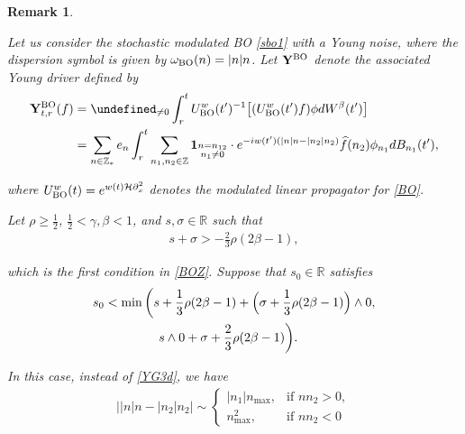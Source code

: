 \documentclass[letterpaper, 11pt,  reqno]{amsart}
\newtheorem{remark}[theorem]{Remark}
\newcommand{\1}{\hspace{0.5mm}\textup{I}\hspace{0.5mm}}
\newcommand{\noi}{\noindent}
\newcommand{\Z}{\mathbb{Z}}
\newcommand{\R}{\mathbb{R}}
\let\P= \undefined
\newcommand{\P}{\mathbf{P}}
\renewcommand{\H}{\mathcal{H}}
\newcommand{\be}{\beta}
\newcommand{\g}{\gamma}
\newcommand{\s}{\sigma}
\newcommand{\ft}{\widehat}
\newcommand{\dx}{\partial_x}
\renewcommand{\o}{\omega}
\newcommand{\ind}{\mathbf 1}
\newcommand{\uw}{U^w}
\newcommand{\BO}{\text{\rm BO} }
\newcommand{\YY}{\mathbf{Y}}
\numberwithin{equation}{section}
\numberwithin{theorem}{section}
\begin{document}
\begin{remark}\label{REM:BO}
\rm


Let us consider the stochastic modulated BO \eqref{sbo1} with a Young noise, 
where the dispersion symbol is given by $\o_\BO(n) = |n|n$.
Let $\YY^\BO$ denote 
the associated Young driver
defined by
\begin{align*}
\YY^\BO_{t, r}(f)
&  = \P_{\ne 0} \int_r^t
\uw_\BO(t')^{-1} \big[ (\uw_\BO(t') f)
\phi dW^\be (t') \big]\\
&
 = \sum_{n\in \Z_*} e_n 
 \int_r^t \sum_{n_1, n_2  \in \Z} \ind_{\substack{n = n_{12}\\n_1 \ne 0}}
\cdot  e^{- i w(t') (|n|n - |n_2|n_2)}\ft f(n_2) \phi_{n_1}    dB_{n_1}(t'), 
\end{align*}

\noi
where 
$\uw_\BO (t)=e^{   w(t)\H\dx^2}  $
denotes the modulated linear propagator for \eqref{BO}.










Let 
$\rho \ge\frac 12$,
$\frac 12 < \g, \be < 1$, and $s, \s \in \R$
such that 
\begin{align}
s + \s > -  \frac 23 \rho (2\be -1 ), 
\label{BOX3}
\end{align}


\noi
which is the first condition in \eqref{BOZ}.
Suppose that 
 $s_0 \in \R$ satisfies
\begin{align}
\begin{split}
s_0 & < \min \bigg(s + \frac 13 \rho(2\be -1)
+ \Big(\s +  \frac 13 \rho(2\be -1)\Big) \wedge 0, \\
& \hphantom{iiXXXX}
s\wedge0 + \s + \frac 23  \rho (2\be -1 )\bigg).
\end{split}
\label{BOX4}
\end{align}

\noi
In this case, instead of \eqref{YG3d}, we have
\begin{align}
\big| |n| n - |n_2| n_2\big|
\sim  \begin{cases}
|n_1| n_{\max}, & \text{if } nn_2 > 0,\\
 n_{\max}^2, & \text{if } nn_2 < 0
\end{cases}
\label{BOX1}
\end{align}


\end{remark}
\end{document}

